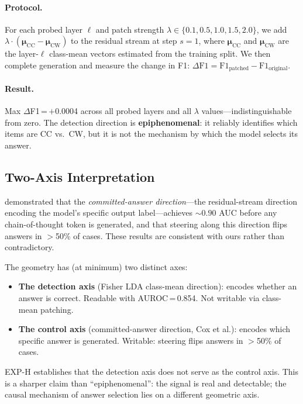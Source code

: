 \documentclass[11pt,twocolumn]{article}
\newcommand{\vect}[1]{\mathbf{#1}}
\begin{document}
\paragraph{Protocol.}
For each probed layer $\ell$ and patch strength
$\lambda \in \{0.1, 0.5, 1.0, 1.5, 2.0\}$, we add
$\lambda \cdot (\vect{\mu}_\text{CC} - \vect{\mu}_\text{CW})$ to the residual stream
at step $s=1$, where $\vect{\mu}_\text{CC}$ and $\vect{\mu}_\text{CW}$ are the
layer-$\ell$ class-mean vectors estimated from the training split. We then complete
generation and measure the change in F1:
$\Delta\text{F1} = \text{F1}_\text{patched} - \text{F1}_\text{original}$.

\paragraph{Result.}
Max $\Delta$F1\,=\,$+$0.0004 across all probed layers and all $\lambda$
values---indistinguishable from zero. The detection direction is
\textbf{epiphenomenal}: it reliably identifies which items are CC vs.\ CW,
but it is not the mechanism by which the model selects its answer.

\subsection{Two-Axis Interpretation}

\citet{cox2026decoding} demonstrated that the \emph{committed-answer direction}---the
residual-stream direction encoding the model's specific output label---achieves
${\sim}0.90$ AUC before any chain-of-thought token is generated, and that steering
along this direction flips answers in $>$50\% of cases. These results are consistent
with ours rather than contradictory.

The geometry has (at minimum) two distinct axes:
\begin{itemize}[leftmargin=2em, topsep=2pt, itemsep=1pt]
  \item \textbf{The detection axis} (Fisher LDA class-mean direction): encodes whether
    an answer is correct. Readable with AUROC\,=\,0.854. Not writable via
    class-mean patching.
  \item \textbf{The control axis} (committed-answer direction, Cox et al.): encodes
    which specific answer is generated. Writable: steering flips answers in
    $>$50\% of cases.
\end{itemize}

EXP-H establishes that the detection axis does not serve as the control axis.
This is a sharper claim than ``epiphenomenal'': the signal is real and detectable;
the causal mechanism of answer selection lies on a different geometric axis.
\end{document}
